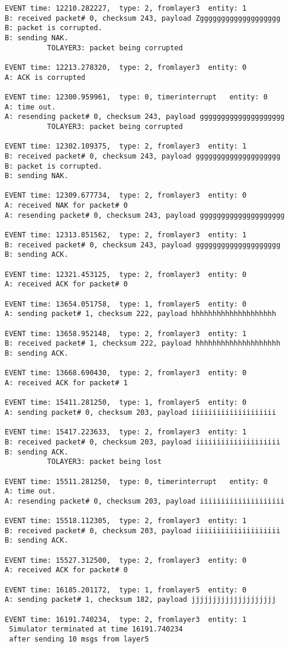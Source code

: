 \documentclass[12pt]{article}
\begin{document}
\begin{verbatim}
EVENT time: 12210.282227,  type: 2, fromlayer3  entity: 1
B: received packet# 0, checksum 243, payload Zggggggggggggggggggg
B: packet is corrupted.
B: sending NAK.
          TOLAYER3: packet being corrupted

EVENT time: 12213.278320,  type: 2, fromlayer3  entity: 0
A: ACK is corrupted

EVENT time: 12300.959961,  type: 0, timerinterrupt   entity: 0
A: time out. 
A: resending packet# 0, checksum 243, payload gggggggggggggggggggg
          TOLAYER3: packet being corrupted

EVENT time: 12302.109375,  type: 2, fromlayer3  entity: 1
B: received packet# 0, checksum 243, payload gggggggggggggggggggg
B: packet is corrupted.
B: sending NAK.

EVENT time: 12309.677734,  type: 2, fromlayer3  entity: 0
A: received NAK for packet# 0
A: resending packet# 0, checksum 243, payload gggggggggggggggggggg

EVENT time: 12313.851562,  type: 2, fromlayer3  entity: 1
B: received packet# 0, checksum 243, payload gggggggggggggggggggg
B: sending ACK.

EVENT time: 12321.453125,  type: 2, fromlayer3  entity: 0
A: received ACK for packet# 0

EVENT time: 13654.051758,  type: 1, fromlayer5  entity: 0
A: sending packet# 1, checksum 222, payload hhhhhhhhhhhhhhhhhhhh

EVENT time: 13658.952148,  type: 2, fromlayer3  entity: 1
B: received packet# 1, checksum 222, payload hhhhhhhhhhhhhhhhhhhh
B: sending ACK.

EVENT time: 13668.690430,  type: 2, fromlayer3  entity: 0
A: received ACK for packet# 1

EVENT time: 15411.281250,  type: 1, fromlayer5  entity: 0
A: sending packet# 0, checksum 203, payload iiiiiiiiiiiiiiiiiiii

EVENT time: 15417.223633,  type: 2, fromlayer3  entity: 1
B: received packet# 0, checksum 203, payload iiiiiiiiiiiiiiiiiiii
B: sending ACK.
          TOLAYER3: packet being lost

EVENT time: 15511.281250,  type: 0, timerinterrupt   entity: 0
A: time out. 
A: resending packet# 0, checksum 203, payload iiiiiiiiiiiiiiiiiiii

EVENT time: 15518.112305,  type: 2, fromlayer3  entity: 1
B: received packet# 0, checksum 203, payload iiiiiiiiiiiiiiiiiiii
B: sending ACK.

EVENT time: 15527.312500,  type: 2, fromlayer3  entity: 0
A: received ACK for packet# 0

EVENT time: 16185.201172,  type: 1, fromlayer5  entity: 0
A: sending packet# 1, checksum 182, payload jjjjjjjjjjjjjjjjjjjj

EVENT time: 16191.740234,  type: 2, fromlayer3  entity: 1
 Simulator terminated at time 16191.740234
 after sending 10 msgs from layer5
\end{verbatim}
\end{document}

